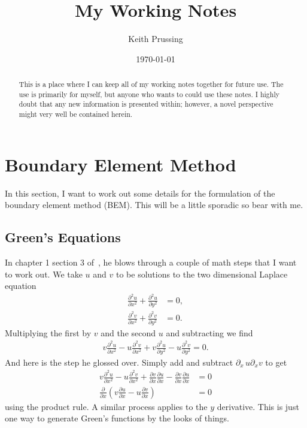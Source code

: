 \documentclass[aps,prl,reprint]{revtex4-1}
\begin{document}
\title{My Working Notes}
\author{Keith Prussing}
\date{\today}

\begin{abstract}
    This is a place where I can keep all of my working notes together
    for future use.  The use is primarily for myself, but anyone who
    wants to could use these notes.  I highly doubt that any new
    information is presented within; however, a novel perspective might
    very well be contained herein.
\end{abstract}
\maketitle

\section{Boundary Element Method}
In this section, I want to work out some details for the formulation of
the boundary element method (BEM).  This will be a little sporadic so
bear with me.

\subsection{Green's Equations}
In chapter 1 section 3 of~\cite{ang_beginners_2007}, he blows through a
couple of math steps that I want to work out.  We take \(u\) and \(v\)
to be solutions to the two dimensional Laplace equation
\begin{align*}
    \frac{\partial^2 u}{\partial x^2} + 
    \frac{\partial^2 u}{\partial y^2} &= 0, \\
    \frac{\partial^2 v}{\partial x^2} + 
    \frac{\partial^2 v}{\partial y^2} &= 0. 
\end{align*}
Multiplying the first by \(v\) and the second \(u\) and subtracting we
find
\begin{align*}
    v\frac{\partial^2 u}{\partial x^2} -
    u\frac{\partial^2 v}{\partial x^2} +
    v\frac{\partial^2 u}{\partial y^2} -
    u\frac{\partial^2 v}{\partial y^2} = 0.
\end{align*}
And here is the step he glossed over.  Simply add and subtract
\(\partial_x\,u\partial_xv\) to get
\begin{align*}
    v\frac{\partial^2 u}{\partial x^2} -
    u\frac{\partial^2 v}{\partial x^2} +
    \frac{\partial v}{\partial x}\frac{\partial u}{\partial x} -
    \frac{\partial v}{\partial x}\frac{\partial u}{\partial x} &= 0 \\
    \frac{\partial}{\partial x}\left( 
        v\frac{\partial u}{\partial x} -u\frac{\partial v}{\partial x}
    \right) &= 0
\end{align*}
using the product rule.  A similar process applies to the \(y\)
derivative.  This is just one way to generate Green's functions by the
looks of things.
\end{document}
